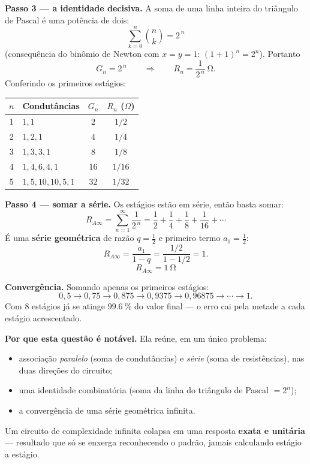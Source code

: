 \begin{questao}[4]{}
{\textbf{Passo 3 --- a identidade decisiva.} A soma de uma linha inteira do
triângulo de Pascal é uma potência de dois:
\[
\sum_{k=0}^{n}\binom{n}{k}=2^{\,n}
\]
(consequência do binômio de Newton com $x=y=1$: $(1+1)^n = 2^n$). Portanto
\[
G_n = 2^{\,n}
\qquad\Longrightarrow\qquad
R_n=\frac{1}{2^{\,n}}\ \si{\ohm}.
\]
Conferindo os primeiros estágios:
\begin{center}\small\sffamily
\begin{tabular}{@{}c l c c@{}}
\toprule
$n$ & \textbf{Condutâncias} & $G_n$ & $R_n$ ($\Omega$)\\
\midrule
1 & $1,1$              & $2$  & $1/2$\\
2 & $1,2,1$            & $4$  & $1/4$\\
3 & $1,3,3,1$          & $8$  & $1/8$\\
4 & $1,4,6,4,1$        & $16$ & $1/16$\\
5 & $1,5,10,10,5,1$    & $32$ & $1/32$\\
\bottomrule
\end{tabular}
\end{center}

\textbf{Passo 4 --- somar a série.} Os estágios estão em série, então basta somar:
\[
R_{A\infty}=\sum_{n=1}^{\infty}\frac{1}{2^{\,n}}
=\frac12+\frac14+\frac18+\frac{1}{16}+\cdots
\]
É uma \textbf{série geométrica} de razão $q=\tfrac12$ e primeiro termo
$a_1=\tfrac12$:
\[
R_{A\infty}=\frac{a_1}{1-q}=\frac{1/2}{1-1/2}=1.
\]
\[
\boxed{\;R_{A\infty}=\SI{1}{\ohm}\;}
\]

\textbf{Convergência.} Somando apenas os primeiros estágios:
\[
0{,}5 \to 0{,}75 \to 0{,}875 \to 0{,}9375 \to 0{,}96875 \to \cdots \to 1.
\]
Com 8 estágios já se atinge $\SI{99.6}{\percent}$ do valor final --- o erro cai
pela metade a cada estágio acrescentado.

\medskip
\textbf{Por que esta questão é notável.} Ela reúne, em um único problema:
\begin{itemize}[leftmargin=1.7em,itemsep=1pt,topsep=2pt]
\item associação \emph{paralelo} (soma de condutâncias) e \emph{série}
      (soma de resistências), nas duas direções do circuito;
\item uma identidade combinatória (soma da linha do triângulo de Pascal $=2^n$);
\item a convergência de uma série geométrica infinita.
\end{itemize}
Um circuito de complexidade infinita colapsa em uma resposta \textbf{exata e
unitária} --- resultado que só se enxerga reconhecendo o padrão, jamais
calculando estágio a estágio.}
\end{questao}

